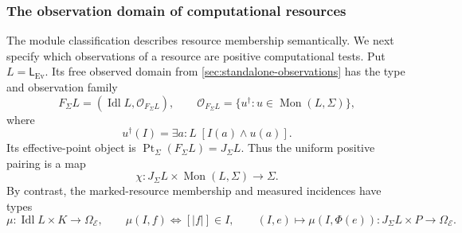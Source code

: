 \documentclass[11pt,a4paper]{article}
\numberwithin{algorithm}{section}
\numberwithin{equation}{section}
\theoremstyle{definition}
\theoremstyle{remark}
\theoremstyle{plain}
\newcommand{\E}{\mathcal E}
\newcommand{\Truth}{\Omega_{\E}}
\newcommand{\OO}{\mathcal O}
\newcommand{\Idl}{\operatorname{Idl}}
\newcommand{\Pt}{\operatorname{Pt}_{\Sigma}}
\newcommand{\J}{J_{\Sigma}}
\newcommand{\F}{F_{\Sigma}}
\newcommand{\Ev}{{\operatorname{Ev}}}
\newcommand{\abs}[1]{\lvert #1\rvert}
\theoremstyle{definition}
\theoremstyle{plain}
\begin{document}
\subsubsection{The observation domain of computational resources}
\label{sec:resource-observations}
The module classification describes resource membership semantically.
We next specify which observations of a resource are positive
computational tests. Put $L=\mathsf L_{\Ev}$. Its free observed domain
from \cref{sec:standalone-observations} has the type and observation family
\[
 \F L=(\Idl L,\OO_{\F L}),\qquad
 \OO_{\F L}=\{u^\dagger:u\in\operatorname{Mon}(L,\Sigma)\},
\]
where
\[
 u^\dagger(I)=\exists a:L\;[I(a)\wedge u(a)].
\]
Its effective-point object is $\Pt(\F L)=\J L$. Thus the uniform
positive pairing is a map
\begin{equation}\label{eq:resource-positive-pairing}
 \chi:\J L\times\operatorname{Mon}(L,\Sigma)\to\Sigma.
\end{equation}
By contrast, the marked-resource membership and measured incidences have
types
\[
 \mu:\Idl L\times K\to\Truth,\qquad
 \mu(I,f)\iff[\abs f]\in I,
 \qquad (I,e)\mapsto\mu(I,\Phi(e)):\J L\times P\to\Truth.
\]
\end{document}
